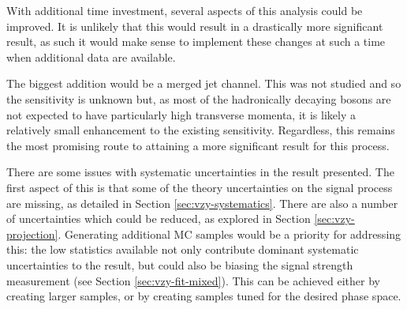 
With additional time investment, several aspects of this analysis could be
improved. It is unlikely that this would result in a drastically more
significant result, as such it would make sense to implement these changes at
such a time when additional data are available.

The biggest addition would be a merged jet channel. This was not studied and so
the sensitivity is unknown but, as most of the hadronically decaying bosons are
not expected to have particularly high transverse momenta, it is likely a
relatively small enhancement to the existing sensitivity. Regardless, this
remains the most promising route to attaining a more significant result for this
process.

There are some issues with systematic uncertainties in the result presented. The
first aspect of this is that some of the theory uncertainties on the signal
process are missing, as detailed in Section \ref{sec:vzy-systematics}. There are
also a number of uncertainties which could be reduced, as explored in Section
\ref{sec:vzy-projection}. Generating additional \ac{MC} samples would be a
priority for addressing this: the low statistics available not only contribute
dominant systematic uncertainties to the result, but could also be biasing the
signal strength measurement (see Section \ref{sec:vzy-fit-mixed}). This can be
achieved either by creating larger samples, or by creating samples tuned for the
desired phase space.
